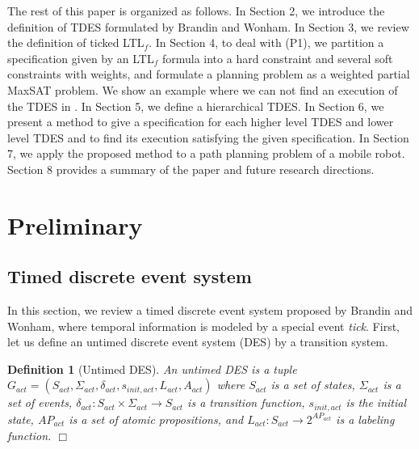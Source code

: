 \documentclass{article}
\newcommand{\qedwhite}{\hfill \ensuremath{\Box}}
\newtheorem{dfn}{Definition}
\begin{document}
%
%
The rest of this paper is organized as follows.
In Section 2, we introduce the definition of TDES formulated by Brandin and Wonham\cite{BW1994}.
In Section 3, we review the definition of ticked LTL$_f$.
In Section 4, to deal with (P1), we partition a specification given by an LTL$_f$ formula into a hard constraint and several soft constraints with weights, and formulate a planning problem as a weighted partial MaxSAT problem.
We show an example where we can not find an execution of the TDES in \cite{KHU2020}.
In Section 5, we define a hierarchical TDES.
In Section 6, we present a method to give a specification for each higher level TDES and lower level TDES and to find its execution satisfying the given specification.
In Section 7, we apply the proposed method to a path planning problem of a mobile robot. 
Section 8 provides a summary of the paper and future research directions.
%
%
\section{Preliminary}
\subsection{Timed discrete event system}\label{tdes}
%
In this section, we review a timed discrete event system proposed by Brandin and Wonham\cite{BW1994}, where temporal information is modeled by a special event {\sl tick}. First, let us define an untimed discrete event system (DES) by a transition system.
%
\begin{dfn}[Untimed DES] \label{def:G_act}
An untimed DES is a tuple $G_{act}=(S_{act}, \Sigma_{act}, \delta_{act}, s_{init,act}, L_{act}, A_{act})$ where $S_{act}$ is a set of states, $\Sigma_{act}$ is a set of events, $\delta_{act} : S_{act} \times \Sigma_{act} \rightarrow S_{act}$ is a transition function, $s_{init,act}$ is the initial state, $AP_{act}$ is a set of atomic propositions, and $L_{act} : S_{act} \rightarrow 2^{AP_{act}}$ is a labeling function. \qedwhite
\end{dfn}
\end{document}

